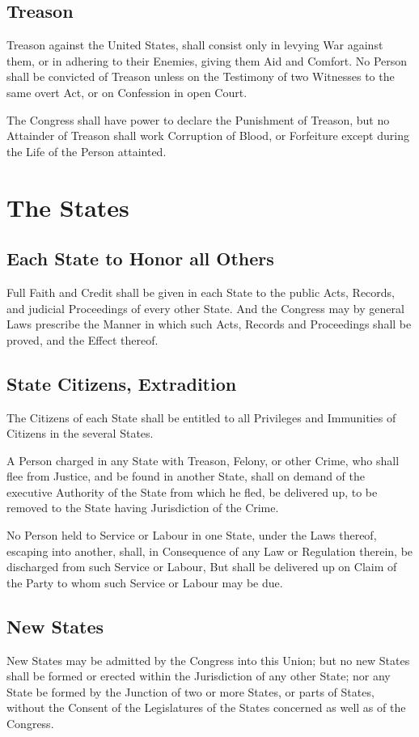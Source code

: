 \documentclass{constitution}
\begin{document}
\section{Treason}
Treason against the United States, shall consist only in levying War against them,
or in adhering to their Enemies, giving them Aid and Comfort.
No Person shall be convicted of Treason unless on the Testimony of two Witnesses to the same overt Act,
or on Confession in open Court.

The Congress shall have power to declare the Punishment of Treason,
but no Attainder of Treason shall work Corruption of Blood,
or Forfeiture except during the Life of the Person attainted.

\chapter{The States}
\section{Each State to Honor all Others}
Full Faith and Credit shall be given in each State to the public Acts, Records, and judicial Proceedings of every other State.
And the Congress may by general Laws prescribe the Manner in which such Acts, Records and Proceedings shall be proved, and the Effect thereof.

\section{State Citizens, Extradition}
The Citizens of each State shall be entitled to all Privileges and Immunities of Citizens in the several States.

A Person charged in any State with Treason, Felony, or other Crime, who shall flee from Justice, and be found in another State,
shall on demand of the executive Authority of the State from which he fled, be delivered up, to be removed to the State having Jurisdiction of the Crime.

No Person held to Service or Labour in one State, under the Laws thereof, escaping into another,
shall, in Consequence of any Law or Regulation therein, be discharged from such Service or Labour,
But shall be delivered up on Claim of the Party to whom such Service or Labour may be due.

\section{New States}
New States may be admitted by the Congress into this Union;
but no new States shall be formed or erected within the Jurisdiction of any other State;
nor any State be formed by the Junction of two or more States, or parts of States,
without the Consent of the Legislatures of the States concerned as well as of the Congress.
\end{document}
